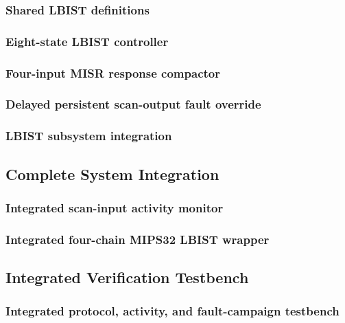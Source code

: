\subsubsection{Shared LBIST definitions}
\leavevmode\par


\subsubsection{Eight-state LBIST controller}
\leavevmode\par


\subsubsection{Four-input MISR response compactor}
\leavevmode\par


\subsubsection{Delayed persistent scan-output fault override}
\leavevmode\par


\subsubsection{LBIST subsystem integration}
\leavevmode\par


\subsection{Complete System Integration}
\subsubsection{Integrated scan-input activity monitor}
\leavevmode\par


\subsubsection{Integrated four-chain MIPS32 LBIST wrapper}
\leavevmode\par


\subsection{Integrated Verification Testbench}
\subsubsection{Integrated protocol, activity, and fault-campaign testbench}
\leavevmode\par


